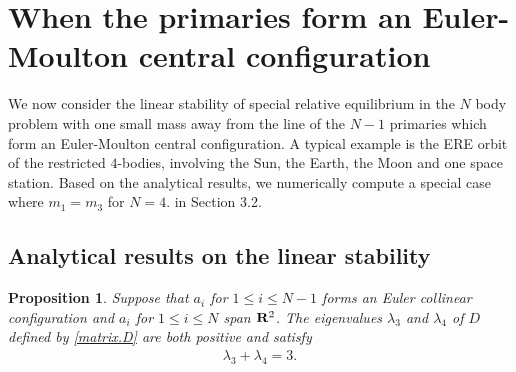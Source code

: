 \documentclass[11pt]{article}
\newtheorem{proposition}[lemma]{Proposition}
\def\R{{\bf R}}
\def\lm{{\lambda}}
\begin{document}
\setcounter{equation}{0}%
\section{When the primaries form an Euler-Moulton central configuration}\label{sec:3}

We now consider the linear stability of special relative equilibrium in the $N$ body problem with one small mass away from the line of the $N-1$ primaries which form an Euler-Moulton central configuration. 
A typical example is the ERE orbit of the restricted
$4$-bodies,  involving  the Sun, the Earth, the Moon and one space station. Based on the analytical results, we numerically compute a special case where \( m_1 = m_3 \) for \( N = 4 \).
 in Section 3.2.

\subsection{Analytical results on the linear stability}
\begin{proposition}\label{prop.sum.lm3.lm4}
  Suppose that $a_i$ for $1\leq i \leq N-1$ forms an Euler collinear configuration and $a_i$ for $1 \leq i \leq N$ span $\R^2$. The eigenvalues $\lm_3$ and $\lm_4$ of $D$ defined by \eqref{matrix.D} are both positive and satisfy
  \begin{align}
    \lm_3 + \lm_4 = 3.
  \end{align}
\end{proposition}
\end{document}
